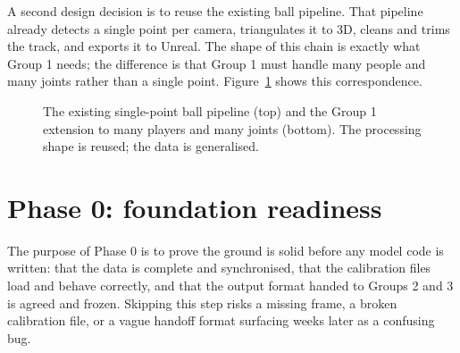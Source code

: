 \documentclass[oneside,openany]{book}
\begin{document}
A second design decision is to reuse the existing ball pipeline. That pipeline already detects a
single point per camera, triangulates it to 3D, cleans and trims the track, and exports it to
Unreal. The shape of this chain is exactly what Group 1 needs; the difference is that Group 1
must handle many people and many joints rather than a single point.
Figure~\ref{fig:ballvsours} shows this correspondence.

\begin{figure}[ht]
\begin{center}
\caption{The existing single-point ball pipeline (top) and the Group 1 extension to many players
and many joints (bottom). The processing shape is reused; the data is generalised.}
\label{fig:ballvsours}
\end{center}
\end{figure}

\section{Phase 0: foundation readiness}
The purpose of Phase 0 is to prove the ground is solid before any model code is written: that
the data is complete and synchronised, that the calibration files load and behave correctly, and
that the output format handed to Groups 2 and 3 is agreed and frozen. Skipping this step risks a
missing frame, a broken calibration file, or a vague handoff format surfacing weeks later as a
confusing bug.
\end{document}
